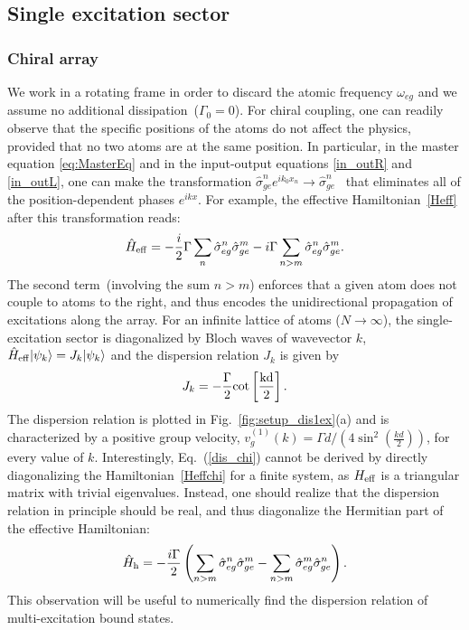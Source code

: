 \documentclass[pra,twocolumn,showpacs,preprintnumbers,amsmath,amssymb]{revtex4-1}
\begin{document}
\subsection{Single excitation sector}


\subsubsection{Chiral array}


We work in a rotating frame in order to discard the atomic frequency $\omega_{eg}$ and we assume  no additional dissipation~($\Gamma_0=0$). 
For chiral coupling, one can readily observe that the specific positions of the atoms do not affect the physics, provided that no two atoms are at the same position. In particular, in the master equation \eqref{eq:MasterEq} and in the input-output equations \eqref{in_outR} and  \eqref{in_outL}, one can make the transformation $\hat \sigma_{ge}^ne^{ik_0x_n}\rightarrow\hat \sigma_{ge}^n$~\cite{Pichler2015,ChiralRev} that eliminates all of the position-dependent phases $e^{ikx}$. For example, the effective Hamiltonian~\eqref{Heff} after this transformation reads:
\begin{equation}\label{Heffchi}
\hat H_{\rm eff}=-\frac{i}{2}\Gamma\sum_{n}\hat\sigma^n_{eg}\hat\sigma^m_{ge}-i\Gamma\sum_{n>m}\hat\sigma^n_{eg}\hat\sigma^m_{ge}.
\end{equation}
%
The second term~(involving the sum $n>m$) enforces that a given atom does not couple to atoms to the right, and thus encodes the unidirectional propagation of excitations along the array. 
For an infinite lattice of atoms ($N\rightarrow \infty$), the single-excitation sector is diagonalized by Bloch waves of wavevector $k$, $\hat H_{\rm eff}|\psi_k\rangle=J_k|\psi_k\rangle$ and the dispersion relation $J_k$ is given by 
\begin{equation}\label{dis_chi}
J_k=-\frac{\Gamma}{2}\rm cot\left[\frac{kd}{2}\right].
\end{equation}
The dispersion relation is plotted in Fig.~\ref{fig:setup_dis1ex}(a) and is characterized by a positive group velocity, $v^{(1)}_g(k)=\Gamma d/(4\sin^2{\left(\frac{kd}{2}\right)})$, for every value of $k$.
Interestingly, Eq.~(\ref{dis_chi}) cannot be derived by directly diagonalizing the Hamiltonian~\eqref{Heffchi} for a finite system, as $H_{\rm eff}$ is a triangular matrix with trivial eigenvalues. Instead, one should realize that the dispersion relation in principle should be real, and thus diagonalize the Hermitian part of the effective Hamiltonian:
\begin{equation}\label{Heff_herm}
\hat H_{\rm h}=-\frac{i\Gamma}{2}\left(\sum_{n>m}\hat\sigma^n_{eg}\hat\sigma^m_{ge}-\sum_{n>m}\hat\sigma^m_{eg}\hat\sigma^n_{ge}\right).
\end{equation}
This observation will be useful to numerically find the dispersion relation of multi-excitation bound states.
\end{document}

